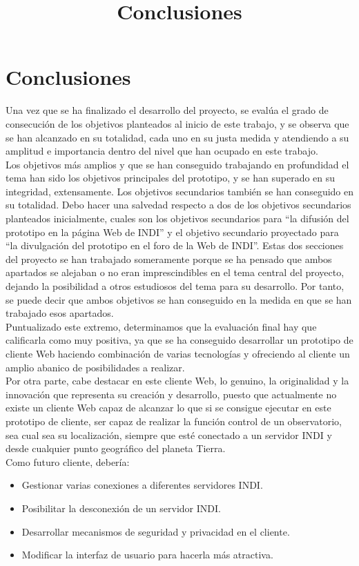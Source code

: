\chapter{Conclusiones}
\title{Conclusiones}
\label{cap:Conclusiones}

Una vez que se ha finalizado el desarrollo del proyecto, se evalúa el grado de consecución de los objetivos planteados  al inicio de este trabajo, y se observa que se han alcanzado en su totalidad, cada uno en su justa medida y atendiendo a su amplitud e importancia dentro del nivel que han ocupado en este trabajo. \\

Los objetivos más amplios y que se han conseguido trabajando en profundidad el tema han sido los objetivos principales del prototipo, y se han superado en su integridad, extensamente.
Los objetivos secundarios también se han conseguido en su totalidad. Debo hacer una salvedad respecto a dos de los objetivos secundarios planteados inicialmente, cuales son los objetivos secundarios para “la difusión del prototipo en la página Web de INDI” y el objetivo secundario proyectado para “la divulgación del prototipo en el foro de la Web de INDI”. Estas dos secciones del proyecto se han trabajado someramente porque se ha pensado que ambos apartados se alejaban o no eran imprescindibles en el tema central del proyecto, dejando la posibilidad a otros estudiosos del tema para su desarrollo. Por tanto, se puede decir que ambos objetivos se han conseguido en la medida en que se han trabajado esos apartados.\\

Puntualizado este extremo, determinamos que la evaluación final hay que calificarla como muy positiva, ya que se ha conseguido desarrollar un prototipo de cliente Web haciendo combinación de varias tecnologías y ofreciendo al cliente un amplio abanico de posibilidades a realizar.\\

Por otra parte, cabe destacar en este cliente Web, lo genuino, la originalidad y la innovación que representa su creación y desarrollo, puesto que actualmente no existe un cliente Web capaz de alcanzar lo que si se consigue ejecutar en este prototipo de cliente, ser  capaz de realizar la función control de un observatorio, sea cual sea su localización, siempre que esté conectado a un servidor INDI y desde cualquier punto geográfico del planeta Tierra.\\

Como futuro cliente, debería:
\begin{itemize}
  \item Gestionar varias conexiones a diferentes servidores INDI.
  \item Posibilitar la desconexión de un servidor INDI.
  \item Desarrollar mecanismos de seguridad y privacidad en el cliente.
  \item Modificar la interfaz de usuario para hacerla más atractiva.
\end{itemize}

